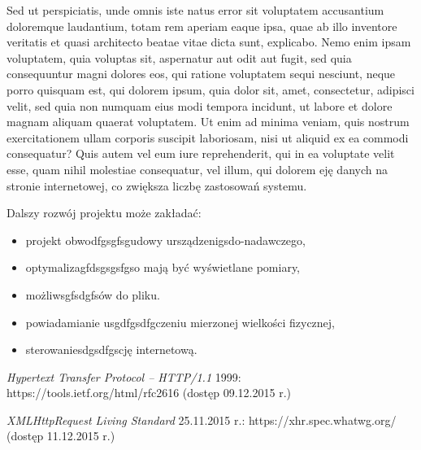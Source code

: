 \documentclass{mgr}
\begin{document}
Sed ut perspiciatis, unde omnis iste natus error sit voluptatem accusantium doloremque laudantium, totam rem aperiam eaque ipsa, quae ab illo inventore veritatis et quasi architecto beatae vitae dicta sunt, explicabo. Nemo enim ipsam voluptatem, quia voluptas sit, aspernatur aut odit aut fugit, sed quia consequuntur magni dolores eos, qui ratione voluptatem sequi nesciunt, neque porro quisquam est, qui dolorem ipsum, quia dolor sit, amet, consectetur, adipisci velit, sed quia non numquam eius modi tempora incidunt, ut labore et dolore magnam aliquam quaerat voluptatem. Ut enim ad minima veniam, quis nostrum exercitationem ullam corporis suscipit laboriosam, nisi ut aliquid ex ea commodi consequatur? Quis autem vel eum iure reprehenderit, qui in ea voluptate velit esse, quam nihil molestiae consequatur, vel illum, qui dolorem eję danych na stronie
internetowej, co zwiększa liczbę zastosowań systemu.
 
Dalszy rozwój projektu może zakładać:
\begin{itemize}
\item projekt obwodfgsgfsgudowy ursządzenigsdo-nadawczego,
\item optymalizagfdsgsgsfgso mają być
wyświetlane pomiary,
\item możliwsgfsdgfsów do pliku.
\item powiadamianie usgdfgsdfgczeniu mierzonej wielkości
fizycznej,
\item sterowaniesdgsdfgscję internetową.
\end{itemize}
  \begin{thebibliography}{9}

   {\em Hypertext Transfer Protocol -- HTTP/1.1} 1999: 
  https://tools.ietf.org/html/rfc2616 (dostęp 09.12.2015 r.)

   {\em XMLHttpRequest Living Standard} 25.11.2015 r.: 
  https://xhr.spec.whatwg.org/ (dostęp 11.12.2015 r.)

  \end{thebibliography}

\listoffigures
{}
 \listoftables
{}
 \lstlistoflistings
\end{document}
